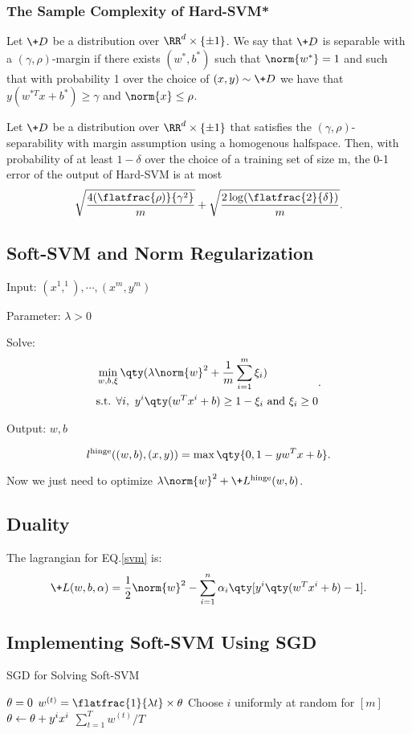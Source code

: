 \subsubsection{The Sample Complexity of Hard-SVM*}
\begin{defi}[Separability]
	Let $\+D$ be a distribution over $\RR^d \times \{\pm1\}$.
	We say that $\+D$ is separable with a $(\gamma,\rho)$-margin if there exists $(w^*,b^*)$ such that $\norm{w^*} = 1$ and such that with probability 1 over the choice of $(x, y) \sim \+D$ we have that $y(w^{*T}x+ b^*)\ge \gamma$ and $\norm{x}\le  \rho$. 
\end{defi}
\begin{thm}
	Let $\+D$ be a distribution over $\RR^d\times\{\pm1\}$ that satisfies the $(\gamma,\rho)$-separability with margin assumption using a homogenous halfspace.
	Then, with probability of at least $1 - \delta$ over the choice of a training set of size m, the 0-1 error of the output of Hard-SVM is at most
	\[
		\sqrt{\frac{4(\flatfrac{\rho)}{\gamma^2}}{m}}+\sqrt{\frac{2\log(\flatfrac{2}{\delta})}{m}}
	.\] 
	
\end{thm}
\subsection{Soft-SVM and Norm Regularization}
\begin{md}
	Input: $(x^1,^1),\cdots,(x^m,y^m)$

	Parameter: $\lambda>0$

	Solve:
	\[
		\begin{aligned}
			& \min_{w,b,\xi}\qty(\lambda\norm{w}^2+\frac{1}{m}\sum_{i=1}^m\xi_i)
			\\
			&\text{s.t. }\forall i,\ y^i\qty(w^Tx^i+b)\ge 1-\xi_i \text{ and }
			\xi_i\ge 0
		\end{aligned}
	.\]

	Output: $w,b$
\end{md}
\begin{defi}
	\[
		l^{\mathrm{hinge}}((w,b),(x,y))=\max\qty{0,1-yw^Tx+b}
	.\]
\end{defi}
Now we just need to optimize $\lambda\norm{w}^2+\+L^{\mathrm{hinge}}(w,b)$.
\subsection{Duality}
The lagrangian for EQ.\ref{svm} is:
\[
	\+L(w,b,\alpha)=\frac{1}{2}\norm{w}^2-\sum_{i=1}^n\alpha_i\qty[y^i\qty(w^Tx^i+b)-1]
.\] 


\subsection{Implementing Soft-SVM Using SGD}
\begin{algorithm}
	\caption{SGD for Solving Soft-SVM}
	\begin{algorithmic}
		\STATE $\*\theta=\*0$
		\STATE $w^{(t)}=\flatfrac{1}{\lambda t}\times\*\theta$
		\STATE Choose $i$ uniformly at random for $[m]$
		\STATE $\*\theta\gets\*\theta+y^ix^i$
		\ENDIF
		\ENDFOR
		\RETURN $\sum_{t=1}^T w^{(t)}/T$
	\end{algorithmic}
\end{algorithm}
